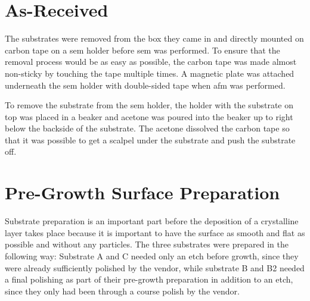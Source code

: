 %

\section{As-Received}
The substrates were removed from the box they came in and directly mounted on carbon tape on a \ac{sem} holder before \ac{sem} was performed. To ensure that the removal process would be as easy as possible, the carbon tape was made almost non-sticky by touching the tape multiple times. A magnetic plate was attached underneath the \ac{sem} holder with double-sided tape when \ac{afm} was performed. 

To remove the substrate from the \ac{sem} holder, the holder with the substrate on top was placed in a beaker and acetone was poured into the beaker up to right below the backside of the substrate. The acetone dissolved the carbon tape so that it was possible to get a scalpel under the substrate and push the substrate off. %

\section{Pre-Growth Surface Preparation}
Substrate preparation is an important part before the deposition of a crystalline layer takes place because it is important to have the surface as smooth and flat as possible and without any particles. The three substrates were prepared in the following way: Substrate A and C needed only an etch before growth, since they were already sufficiently polished by the vendor, while substrate B and B2 needed a final polishing as part of their pre-growth preparation in addition to an etch, since they only had been through a course polish by the vendor.

